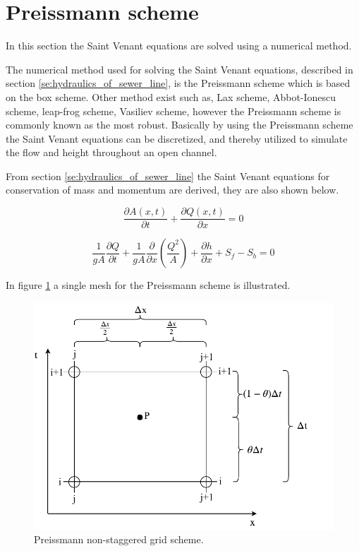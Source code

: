 ﻿\section{Preissmann scheme}\label{subse:preissmann_scheme}
In this section the Saint Venant equations are solved using a numerical method.


The numerical method used for solving the Saint Venant equations, described in section \ref{se:hydraulics_of_sewer_line}, is the Preissmann scheme which is based on the box scheme. Other method exist such as, Lax scheme, Abbot-Ionescu scheme, leap-frog scheme, Vasiliev scheme, however the Preissmann scheme is commonly known as the most robust. Basically by using the Preissmann scheme the Saint Venant equations can be discretized, and thereby utilized to simulate the flow and height throughout an open channel.

From section \ref{se:hydraulics_of_sewer_line} the Saint Venant equations for conservation of mass and momentum are derived, they are also shown below.

\begin{equation}\label{eq:saintbernard_mass_preiss}
\frac{\partial A(x,t)}{\partial t} + \frac{\partial Q(x,t)}{\partial x}=0
\end{equation}

\begin{equation}\label{eq:saintbernard_momentum_preiss}
\frac{1}{gA} \frac{\partial Q}{\partial t} +\frac{1}{gA}\frac{\partial}{\partial x} \left( \frac{Q^2}{A} \right) + \frac{\partial h}{\partial x} + S_f - S_b = 0
\end{equation}


In figure \ref{fig:preissmann_grid_scheme} a single mesh for the Preissmann scheme is illustrated.

\begin{figure}[H]
\centering
\includegraphics[width=.6\textwidth]{report/simulation/pictures/preissmann_scheme}
\caption{Preissmann non-staggered grid scheme.}
\label{fig:preissmann_grid_scheme}
\end{figure}

